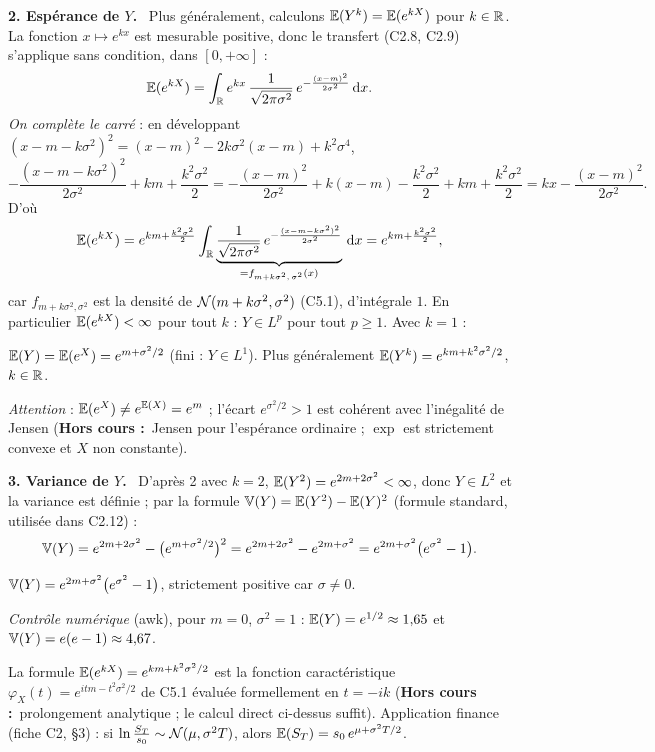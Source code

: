 \documentclass[11pt,a4paper]{article}
\newcommand{\question}[1]{\par\medskip\noindent\textbf{#1}~}
\newcommand{\HC}{\textbf{Hors cours :}~}
\begin{document}
\begin{exo}
\question{2. Espérance de $Y$.} Plus généralement, calculons $\mathbb{E}(Y^k)=\mathbb{E}(e^{kX})$ pour $k\in\mathbb{R}$. La fonction $x\mapsto e^{kx}$ est
mesurable positive, donc le transfert (C2.8, C2.9) s'applique sans condition, dans $[0,+\infty]$ :
\[\mathbb{E}(e^{kX})=\int_{\mathbb{R}} e^{kx}\,\frac{1}{\sqrt{2\pi\sigma^2}}\,e^{-\frac{(x-m)^2}{2\sigma^2}}\,\mathrm{d} x.\]
\emph{On complète le carré} : en développant $(x-m-k\sigma^2)^2=(x-m)^2-2k\sigma^2(x-m)+k^2\sigma^4$,
\[-\frac{(x-m-k\sigma^2)^2}{2\sigma^2}+km+\frac{k^2\sigma^2}{2}
=-\frac{(x-m)^2}{2\sigma^2}+k(x-m)-\frac{k^2\sigma^2}2+km+\frac{k^2\sigma^2}{2}=kx-\frac{(x-m)^2}{2\sigma^2}.\]
D'où
\[\mathbb{E}(e^{kX})=e^{km+\frac{k^2\sigma^2}{2}}\int_{\mathbb{R}}\underbrace{\frac{1}{\sqrt{2\pi\sigma^2}}\,e^{-\frac{(x-m-k\sigma^2)^2}{2\sigma^2}}}_{=f_{m+k\sigma^2,\,\sigma^2}(x)}\,\mathrm{d} x
=e^{km+\frac{k^2\sigma^2}{2}},\]
car $f_{m+k\sigma^2,\sigma^2}$ est la densité de $\mathcal{N}(m+k\sigma^2,\sigma^2)$ (C5.1), d'intégrale $1$. En particulier $\mathbb{E}(e^{kX})<\infty$
pour tout $k$ : $Y\in L^p$ pour tout $p\ge1$. Avec $k=1$ :

\begin{resultat}
$\mathbb{E}(Y)=\mathbb{E}(e^X)=e^{m+\sigma^2/2}$ \quad (fini : $Y\in L^1$). Plus généralement $\mathbb{E}(Y^k)=e^{km+k^2\sigma^2/2}$, $k\in\mathbb{R}$.
\end{resultat}
\emph{Attention} : $\mathbb{E}(e^X)\ne e^{\mathbb{E}(X)}=e^m$ ; l'écart $e^{\sigma^2/2}>1$ est cohérent avec l'inégalité de Jensen
(\HC Jensen pour l'espérance ordinaire ; $\exp$ est strictement convexe et $X$ non constante).

\question{3. Variance de $Y$.} D'après 2 avec $k=2$, $\mathbb{E}(Y^2)=e^{2m+2\sigma^2}<\infty$, donc $Y\in L^2$ et la variance est définie ;
par la formule $\operatorname{\mathbb{V}}(Y)=\mathbb{E}(Y^2)-\mathbb{E}(Y)^2$ (formule standard, utilisée dans C2.12) :
\[\operatorname{\mathbb{V}}(Y)=e^{2m+2\sigma^2}-\bigl(e^{m+\sigma^2/2}\bigr)^2=e^{2m+2\sigma^2}-e^{2m+\sigma^2}=e^{2m+\sigma^2}\bigl(e^{\sigma^2}-1\bigr).\]

\begin{resultat}
$\operatorname{\mathbb{V}}(Y)=e^{2m+\sigma^2}\bigl(e^{\sigma^2}-1\bigr)$, \quad strictement positive car $\sigma\ne0$.
\end{resultat}

\textit{Contrôle numérique} (awk), pour $m=0$, $\sigma^2=1$ : $\mathbb{E}(Y)=e^{1/2}\approx1{,}65$ et $\operatorname{\mathbb{V}}(Y)=e(e-1)\approx4{,}67$.

\begin{remarque}
La formule $\mathbb{E}(e^{kX})=e^{km+k^2\sigma^2/2}$ est la fonction caractéristique $\varphi_X(t)=e^{itm-t^2\sigma^2/2}$ de C5.1 évaluée formellement
en $t=-ik$ (\HC prolongement analytique ; le calcul direct ci-dessus suffit). Application finance (fiche C2, §3) : si
$\ln\frac{S_T}{s_0}\sim\mathcal{N}(\mu,\sigma^2T)$, alors $\mathbb{E}(S_T)=s_0\,e^{\mu+\sigma^2T/2}$.
\end{remarque}
\end{exo}
\end{document}
